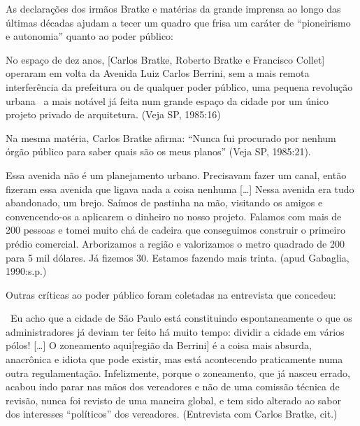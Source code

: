 \documentclass[11pt,fleqn]{book} %
\begin{document}
\begin{citacao}
	As declarações dos irmãos Bratke e matérias da grande imprensa ao longo das últimas décadas ajudam a tecer um quadro que frisa um caráter de \enquote{pioneirismo e autonomia} quanto ao poder público:
	
	\begin{citacao}
		No espaço de dez anos, [Carlos Bratke, Roberto Bratke e Francisco Collet] operaram em volta da Avenida Luiz Carlos Berrini, sem a mais remota interferência da prefeitura ou de qualquer poder público, uma pequena revolução urbana \textemdash\ a mais notável já feita num grande espaço da cidade por um único projeto privado de arquitetura. (Veja SP, 1985:16)
	\end{citacao}
	
	Na mesma matéria, Carlos Bratke afirma: \enquote{Nunca fui procurado por nenhum órgão público para saber quais são os meus planos} (Veja SP, 1985:21).
	
	\begin{citacao}		
		Essa avenida não é um planejamento urbano. Precisavam fazer um canal, então fizeram essa avenida que ligava nada a coisa nenhuma [\dots] Nessa avenida era tudo abandonado, um brejo. Saímos de pastinha na mão, visitando os amigos e convencendo-os a aplicarem o dinheiro no nosso projeto. Falamos com mais de 200 pessoas e tomei muito chá de cadeira que conseguimos construir o primeiro prédio comercial. Arborizamos a região e valorizamos o metro quadrado de 200 para 5 mil dólares. Já fizemos 30. Estamos fazendo mais trinta. (apud Gabaglia, 1990:s.p.)
	\end{citacao}
	
	Outras críticas ao poder público foram coletadas na entrevista que concedeu:
	
	\begin{citacao}
		\textemdash\ Eu acho que a cidade de São Paulo está constituindo espontaneamente o que os administradores já deviam ter feito há muito tempo: dividir a cidade em vários pólos! [\dots] O zoneamento aqui[região da Berrini] é a coisa mais absurda, anacrônica e idiota que pode existir, mas está acontecendo praticamente numa outra regulamentação. Infelizmente, porque o zoneamento, que já nasceu errado, acabou indo parar nas mãos dos vereadores e não de uma comissão técnica de revisão, nunca foi revisto de uma maneira global, e tem sido alterado ao sabor dos interesses \enquote{políticos} dos vereadores. (Entrevista com Carlos Bratke, cit.)
	\end{citacao}	
\end{citacao}
\end{document}
